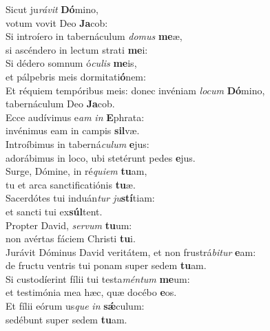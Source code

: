 \evenverse Sicut ju\textit{rá}\textit{vit} \textbf{Dó}mino,~\*\\
\evenverse votum vovit Deo \textbf{Ja}cob:\\
\oddverse Si introíero in tabernáculum \textit{do}\textit{mus} \textbf{me}æ,~\*\\
\oddverse si ascéndero in lectum strati \textbf{me}i:\\
\evenverse Si dédero somnum ó\textit{cu}\textit{lis} \textbf{me}is,~\*\\
\evenverse et pálpebris meis dormitati\textbf{ó}nem:\\
\oddverse Et réquiem tempóribus meis: donec invéniam \textit{lo}\textit{cum} \textbf{Dó}mino,~\*\\
\oddverse tabernáculum Deo \textbf{Ja}cob.\\
\evenverse Ecce audívimus e\textit{am} \textit{in} \textbf{E}phrata:~\*\\
\evenverse invénimus eam in campis \textbf{sil}væ.\\
\oddverse Introíbimus in taberná\textit{cu}\textit{lum} \textbf{e}jus:~\*\\
\oddverse adorábimus in loco, ubi stetérunt pedes \textbf{e}jus.\\
\evenverse Surge, Dómine, in ré\textit{qui}\textit{em} \textbf{tu}am,~\*\\
\evenverse tu et arca sanctificatiónis \textbf{tu}æ.\\
\oddverse Sacerdótes tui induán\textit{tur} \textit{ju}\textbf{stí}tiam:~\*\\
\oddverse et sancti tui ex\textbf{súl}tent.\\
\evenverse Propter David, \textit{ser}\textit{vum} \textbf{tu}um:~\*\\
\evenverse non avértas fáciem Christi \textbf{tu}i.\\
\oddverse Jurávit Dóminus David veritátem, et non frustrá\textit{bi}\textit{tur} \textbf{e}am:~\*\\
\oddverse de fructu ventris tui ponam super sedem \textbf{tu}am.\\
\evenverse Si custodíerint fílii tui testa\textit{mén}\textit{tum} \textbf{me}um:~\*\\
\evenverse et testimónia mea hæc, quæ docébo \textbf{e}os.\\
\oddverse Et fílii eórum us\textit{que} \textit{in} \textbf{sǽ}culum:~\*\\
\oddverse sedébunt super sedem \textbf{tu}am.\\
